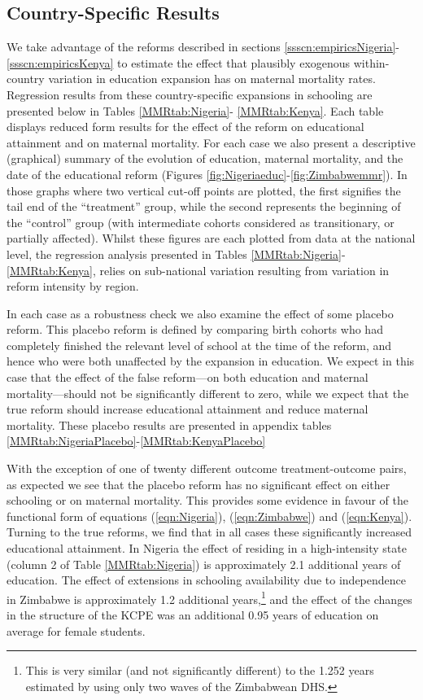 \documentclass{article}[12pt,subeqn]
\begin{document}
\begin{spacing}{1.4}
\subsection{Country-Specific Results}
We take advantage of the reforms described in sections 
\ref{ssscn:empiricsNigeria}-\ref{ssscn:empiricsKenya} to estimate the effect that 
plausibly exogenous within-country variation in education expansion has on 
maternal mortality rates. Regression results from these country-specific 
expansions in schooling are presented below in Tables \ref{MMRtab:Nigeria}-%
\ref{MMRtab:Kenya}. Each table displays reduced form results for the effect of 
the reform on educational attainment and on maternal mortality. For each case we 
also present a descriptive (graphical) summary of the evolution of education, 
maternal mortality, and the date of the educational reform (Figures 
\ref{fig:Nigeriaeduc}-\ref{fig:Zimbabwemmr}). In those graphs where two vertical 
cut-off points are plotted, the first signifies the tail end of the ``treatment'' 
group, while the second represents the beginning of the ``control'' group (with 
intermediate cohorts considered as transitionary, or partially affected). Whilst 
these figures are each plotted from data at the national level, the regression 
analysis presented in Tables \ref{MMRtab:Nigeria}-\ref{MMRtab:Kenya}, relies on 
sub-national variation resulting from variation in reform intensity by region. 

In each case as a robustness check we also examine the effect of some placebo 
reform. This placebo reform is defined by comparing birth cohorts who had 
completely finished the relevant level of school at the time of the reform, and 
hence who were both unaffected by the expansion in education.  We expect in this 
case that the effect of the false reform---on both education and maternal 
mortality---should not be significantly different to zero, while we expect that 
the true reform should increase educational attainment and reduce maternal 
mortality.  These placebo results are presented in appendix tables 
\ref{MMRtab:NigeriaPlacebo}-\ref{MMRtab:KenyaPlacebo}

With the exception of one of twenty different outcome treatment-outcome pairs, as 
expected we see that the placebo reform has no significant effect on either 
schooling or on maternal mortality.  This provides some evidence in favour of the 
functional form of equations (\ref{eqn:Nigeria}), (\ref{eqn:Zimbabwe}) and 
(\ref{eqn:Kenya}). Turning to the true reforms, we find that in all cases these 
significantly increased educational attainment. In Nigeria the effect of residing 
in a high-intensity state (column 2 of Table \ref{MMRtab:Nigeria}) is approximately 
2.1 additional years of education.  The effect of extensions in schooling 
availability due to independence in Zimbabwe is approximately 1.2 additional 
years,\footnote{This is very similar (and not significantly different) to the 
1.252 years estimated by \citet{AgueroBharawadj2011} using only two waves of the 
Zimbabwean DHS.} and the effect of the changes in the structure of the KCPE was an 
additional 0.95 years of education on average for female students.


\end{spacing}
\end{document}
